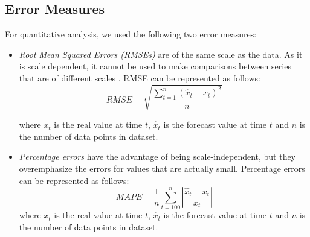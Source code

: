 \subsection{Error Measures}
For quantitative analysis, we used the following two error measures:

\begin{itemize}
\item \textit{Root Mean Squared Errors (RMSEs)} are of the same scale as the data. As it is scale dependent, it cannot be used to make comparisons between series that are of different scales \cite{Forecasting_OTexts}. RMSE can be represented as follows:
$$RMSE=\sqrt{\frac{\sum_{t=1}^{n}(\hat{x}_{t}-x_{t})^{2}}{n}}$$

where $x_{t}$ is the real value at time $t$,  $\hat{x}_{t}$ is the forecast value at time $t$ and $n$ is the number of data points in dataset.

\item \textit{Percentage errors} have the advantage of being scale-independent, but they overemphasize the errors for values that are actually small. Percentage errors can be represented as follows:
$$MAPE=\frac{1}{n}\sum_{t=100}^{n}\left | \frac{\hat{x}_{t}-x_{t}}{x_{t}} \right |$$
where $x_{t}$ is the real value at time $t$,  $\hat{x}_{t}$ is the forecast value at time $t$ and $n$ is the number of data points in dataset.

\end{itemize}